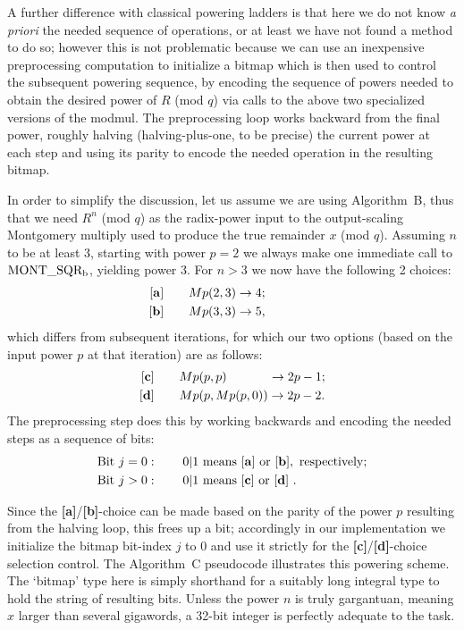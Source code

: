\documentclass{article}
\newcommand \ra {\rightarrow}
\begin{document}
A further difference with classical powering ladders is that here we do not know {\em a priori} the needed sequence of operations, or at least we have not found a method to do so; however this is not problematic because we can use an inexpensive preprocessing computation to initialize a bitmap which is then used to control the subsequent powering sequence, by encoding the sequence of powers needed to obtain the desired power of $R$ (mod $q$) via calls to the above two specialized versions of the modmul. The preprocessing loop works backward from the final power, roughly halving (halving-plus-one, to be precise) the current power at each step and using its parity to encode the needed operation in the resulting bitmap.

In order to simplify the discussion, let us assume we are using Algorithm~B, thus that we need $R^n$ (mod $q$) as the radix-power input to the output-scaling Montgomery multiply used to produce the true remainder $x$ (mod $q$). Assuming $n$ to be at least 3, starting with power $p = 2$ we always make one immediate call to ${\rm MONT\_SQR_b}$, yielding power 3. For $n > 3$ we now have the following 2 choices:
\vspace{-0.1in}
\begin{align}
\nonumber	{\bf [a]}\qquad Mp(2,3) &\ra 4;	\qquad\qquad	\\
\nonumber	{\bf [b]}\qquad Mp(3,3) &\ra 5,	\qquad\qquad
\end{align}
which differs from subsequent iterations, for which our two options (based on the input power $p$ at that iteration) are as follows:
\vspace{-0.2in}
\begin{align}
\nonumber	{\bf [c]}\qquad &Mp(p,p) \qquad\ \ \ \ \ra 2p-1;	\\
\nonumber	{\bf [d]}\qquad &Mp(p,Mp(p,0)) \ra 2p-2.
\end{align}
The preprocessing step does this by working backwards and encoding the needed steps as a sequence of bits:
\begin{align}
\nonumber	&{\rm Bit}\ j = 0 :\qquad 0|1\ {\rm means}\ {\bf [a]}\ {\rm or}\ {\bf [b]},\ {\rm respectively};	\\
\nonumber	&{\rm Bit}\ j > 0 :\qquad 0|1\ {\rm means}\ {\bf [c]}\ {\rm or}\ {\bf [d]}\ .
\end{align}

Since the {\bf [a]}/{\bf [b]}-choice can be made based on the parity of the power $p$ resulting from the halving loop, this frees up a bit; accordingly in our implementation we initialize the bitmap bit-index $j$ to 0 and use it strictly for the {\bf [c]}/{\bf [d]}-choice selection control. The Algorithm~C pseudocode illustrates this powering scheme. The `bitmap' type here is simply shorthand for a suitably long integral type to hold the string of resulting bits. Unless the power $n$ is truly gargantuan, meaning $x$ larger than several gigawords, a 32-bit integer is perfectly adequate to the task.
\end{document}
